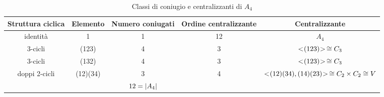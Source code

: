 \begin{sidewaystable}
	\centering
	\begin{tabular}{ccccc}
		\toprule
		Struttura ciclica & Elemento & Numero coniugati & Ordine centralizzante & Centralizzante \\
		\midrule
		identità & 1 & 1 & 12 & $A_4$ \\
		3-cicli & (123) & 4 & 3 & $< \negmedspace (123) \negmedspace > \,\cong C_3$ \\
		3-cicli & (132) & 4 & 3 & $< \negmedspace (123) \negmedspace > \,\cong C_3$ \\
		doppi 2-cicli & (12)(34) & 3 & 4 & $< \negmedspace (12)(34),(14)(23) \negmedspace > \,\cong C_2 \times C_2 \cong V$ \\
		\midrule
		& & $12 = \lvert A_4 \rvert$ & & \\
		\bottomrule
	\end{tabular}
	\caption{Classi di coniugio e centralizzanti di $A_4$}
	\label{fig:classi_coniugio_a4}
\end{sidewaystable}
